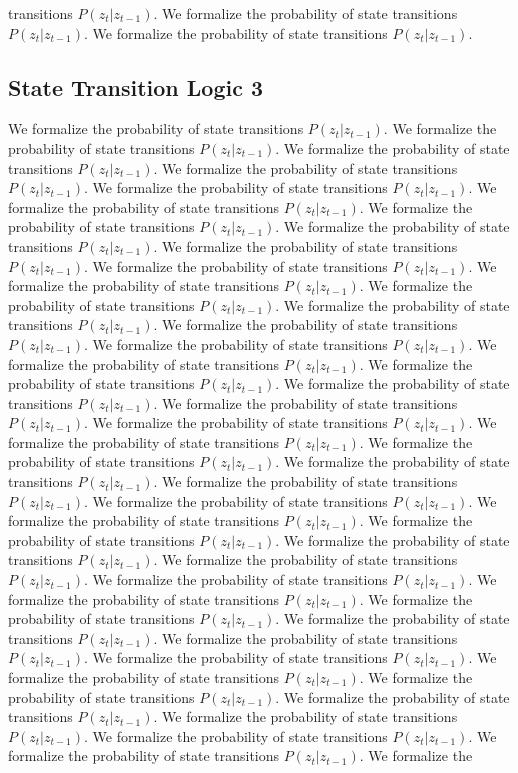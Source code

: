 transitions $P(z_t | z_{t-1})$. We formalize the probability of state transitions $P(z_t | z_{t-1})$. We formalize the probability of state transitions $P(z_t | z_{t-1})$. 

\subsection{State Transition Logic 3}
We formalize the probability of state transitions $P(z_t | z_{t-1})$. We formalize the probability of state transitions $P(z_t | z_{t-1})$. We formalize the probability of state transitions $P(z_t | z_{t-1})$. We formalize the probability of state transitions $P(z_t | z_{t-1})$. We formalize the probability of state transitions $P(z_t | z_{t-1})$. We formalize the probability of state transitions $P(z_t | z_{t-1})$. We formalize the probability of state transitions $P(z_t | z_{t-1})$. We formalize the probability of state transitions $P(z_t | z_{t-1})$. We formalize the probability of state transitions $P(z_t | z_{t-1})$. We formalize the probability of state transitions $P(z_t | z_{t-1})$. We formalize the probability of state transitions $P(z_t | z_{t-1})$. We formalize the probability of state transitions $P(z_t | z_{t-1})$. We formalize the probability of state transitions $P(z_t | z_{t-1})$. We formalize the probability of state transitions $P(z_t | z_{t-1})$. We formalize the probability of state transitions $P(z_t | z_{t-1})$. We formalize the probability of state transitions $P(z_t | z_{t-1})$. We formalize the probability of state transitions $P(z_t | z_{t-1})$. We formalize the probability of state transitions $P(z_t | z_{t-1})$. We formalize the probability of state transitions $P(z_t | z_{t-1})$. We formalize the probability of state transitions $P(z_t | z_{t-1})$. We formalize the probability of state transitions $P(z_t | z_{t-1})$. We formalize the probability of state transitions $P(z_t | z_{t-1})$. We formalize the probability of state transitions $P(z_t | z_{t-1})$. We formalize the probability of state transitions $P(z_t | z_{t-1})$. We formalize the probability of state transitions $P(z_t | z_{t-1})$. We formalize the probability of state transitions $P(z_t | z_{t-1})$. We formalize the probability of state transitions $P(z_t | z_{t-1})$. We formalize the probability of state transitions $P(z_t | z_{t-1})$. We formalize the probability of state transitions $P(z_t | z_{t-1})$. We formalize the probability of state transitions $P(z_t | z_{t-1})$. We formalize the probability of state transitions $P(z_t | z_{t-1})$. We formalize the probability of state transitions $P(z_t | z_{t-1})$. We formalize the probability of state transitions $P(z_t | z_{t-1})$. We formalize the probability of state transitions $P(z_t | z_{t-1})$. We formalize the probability of state transitions $P(z_t | z_{t-1})$. We formalize the probability of state transitions $P(z_t | z_{t-1})$. We formalize the probability of state transitions $P(z_t | z_{t-1})$. We formalize the probability of state transitions $P(z_t | z_{t-1})$. We formalize the probability of state transitions $P(z_t | z_{t-1})$. We formalize the probability of state transitions $P(z_t | z_{t-1})$. We formalize the probability of state transitions $P(z_t | z_{t-1})$. We formalize the 